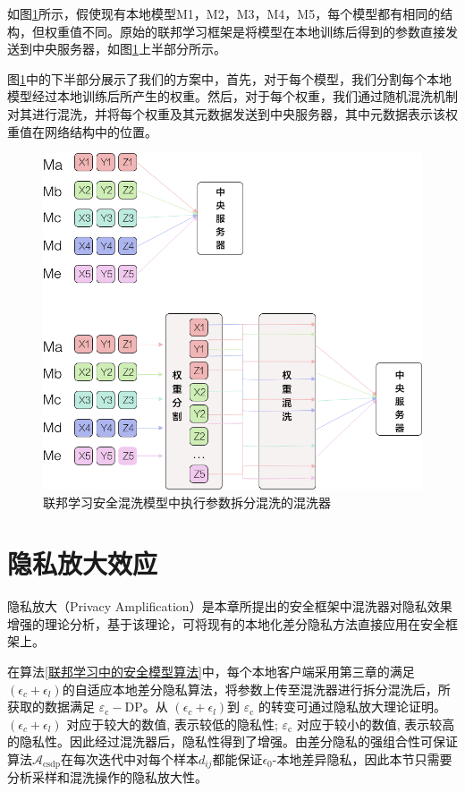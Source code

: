 如图\ref{fig:联邦学习安全混洗模型中执行参数拆分混洗的混洗器}所示，假使现有本地模型M1，M2，M3，M4，M5，每个模型都有相同的结构，但权重值不同。原始的联邦学习框架是将模型在本地训练后得到的参数直接发送到中央服务器，如图\ref{fig:联邦学习安全混洗模型中执行参数拆分混洗的混洗器}上半部分所示。

图\ref{fig:联邦学习安全混洗模型中执行参数拆分混洗的混洗器}中的下半部分展示了我们的方案中，首先，对于每个模型，我们分割每个本地模型经过本地训练后所产生的权重。然后，对于每个权重，我们通过随机混洗机制对其进行混洗，并将每个权重及其元数据发送到中央服务器，其中元数据表示该权重值在网络结构中的位置。

\begin{figure}[!hbt]
\centering
	\includegraphics[scale=0.4]{fig2/C4/混洗器}%
	\caption{联邦学习安全混洗模型中执行参数拆分混洗的混洗器}
	\label{fig:联邦学习安全混洗模型中执行参数拆分混洗的混洗器}	
\end{figure}

\section{隐私放大效应}
隐私放大（Privacy Amplification）是本章所提出的安全框架中混洗器对隐私效果增强的理论分析，基于该理论，可将现有的本地化差分隐私方法直接应用在安全框架上。

在算法\ref{联邦学习中的安全模型算法}中，每个本地客户端采用第三章的满足$\left(\epsilon_{c}+\epsilon_{l}\right)$的自适应本地差分隐私算法，将参数上传至混洗器进行拆分混洗后，所获取的数据满足 $\varepsilon_{\mathrm{c}}-\mathrm{DP}$。从 $\left(\epsilon_{c}+\epsilon_{l}\right)$到 $\varepsilon_{\mathrm{c}}$ 的转变可通过隐私放大理论证明。$\left(\epsilon_{c}+\epsilon_{l}\right)$ 对应于较大的数值, 表示较低的隐私性; $\varepsilon_{\mathrm{c}}$ 对应于较小的数值, 表示较高的隐私性。因此经过混洗器后，隐私性得到了增强。由差分隐私的强组合性可保证算法$\mathcal{A}_{\text {csdp}}$在每次迭代中对每个样本$d_{i j}$都能保证$\epsilon_{0}$-本地差异隐私，因此本节只需要分析采样和混洗操作的隐私放大性。

